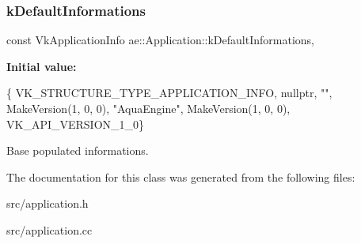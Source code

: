 \subsubsection{\texorpdfstring{k\+Default\+Informations}{kDefaultInformations}}
{\footnotesize\ttfamily const Vk\+Application\+Info ae\+::\+Application\+::k\+Default\+Informations\hspace{0.3cm}{\ttfamily [inline]}, {\ttfamily [static]}}

{\bfseries Initial value\+:}
\begin{DoxyCode}
\{
        VK\_STRUCTURE\_TYPE\_APPLICATION\_INFO,
        \textcolor{keyword}{nullptr},
        \textcolor{stringliteral}{""},
        MakeVersion(1, 0, 0),
        \textcolor{stringliteral}{"AquaEngine"},
        MakeVersion(1, 0, 0),
        VK\_API\_VERSION\_1\_0\}
\end{DoxyCode}


Base populated informations. 



The documentation for this class was generated from the following files\+:\begin{DoxyCompactItemize}
\item 
src/application.\+h\item 
src/application.\+cc\end{DoxyCompactItemize}
